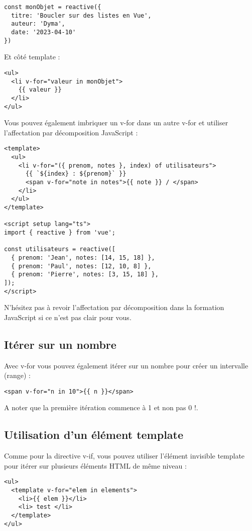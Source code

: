 \begin{verbatim}
const monObjet = reactive({
  titre: 'Boucler sur des listes en Vue',
  auteur: 'Dyma',
  date: '2023-04-10'
})
\end{verbatim}
Et côté template :
\begin{verbatim}
<ul>
  <li v-for="valeur in monObjet">
    {{ valeur }}
  </li>
</ul>
\end{verbatim}
Vous pouvez également imbriquer un {\color{monOrange}v-for} dans un autre {\color{monOrange}v-for} et utiliser l'affectation par décomposition JavaScript :
\begin{verbatim}
<template>
  <ul>
    <li v-for="({ prenom, notes }, index) of utilisateurs">
      {{ `${index} : ${prenom}` }}
      <span v-for="note in notes">{{ note }} / </span>
    </li>
  </ul>
</template>

<script setup lang="ts">
import { reactive } from 'vue';

const utilisateurs = reactive([
  { prenom: 'Jean', notes: [14, 15, 18] },
  { prenom: 'Paul', notes: [12, 10, 8] },
  { prenom: 'Pierre', notes: [3, 15, 18] },
]);
</script>
\end{verbatim}
N'hésitez pas à revoir l'affectation par décomposition dans la formation JavaScript si ce n'est pas clair pour vous.

\subsection{Itérer sur un nombre}
Avec {\color{monOrange}v-for} vous pouvez également itérer sur un nombre pour créer un intervalle ({\color{monOrange}range}) :
\begin{verbatim}
<span v-for="n in 10">{{ n }}</span>
\end{verbatim}
A noter que la première itération commence à 1 et non pas 0 !.

\subsection{Utilisation d'un élément template}
Comme pour la directive {\color{monOrange}v-if}, vous pouvez utiliser l'élément invisible {\color{monOrange}template} pour itérer sur plusieurs éléments HTML de même niveau :
\begin{verbatim}
<ul>
  <template v-for="elem in elements">
    <li>{{ elem }}</li>
    <li> test </li>
  </template>
</ul>
\end{verbatim}

